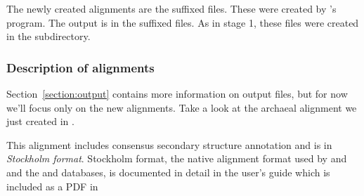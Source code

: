 The newly created alignments are the  suffixed files. These
were created by 's  program. The
 output is in the  suffixed files.  As in
stage 1, these files were created in the 
subdirectory. 

\subsubsection{Description of alignments}

Section~\ref{section:output} contains more information
on  output files, but for now we'll focus only on the new
alignments.  Take a look at the archaeal alignment we just created in
.

This alignment includes consensus secondary structure annotation and
is in \emph{Stockholm format}. 
Stockholm format, the native alignment format used by  and
 and the  and 
databases, is documented in detail in the  user's
guide which is included as a PDF in 

